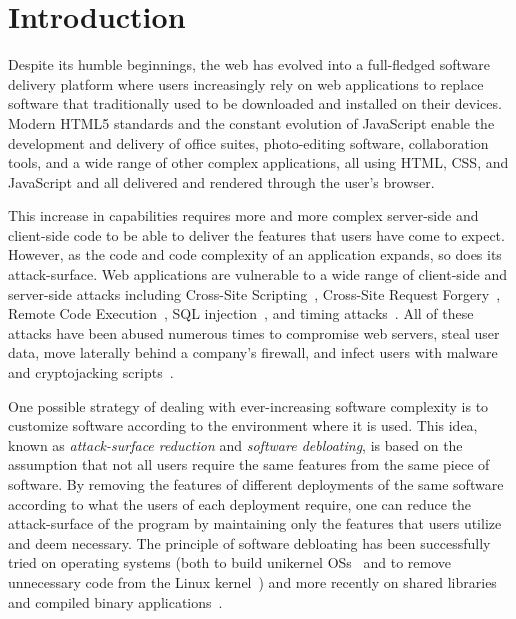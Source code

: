 \section{Introduction}


Despite its humble beginnings, the web has evolved into a full-fledged
software delivery platform where users increasingly rely on web applications
to replace software that traditionally used to be downloaded and installed on
their devices. Modern HTML5 standards and the constant evolution of JavaScript
enable the development and delivery of office suites, photo-editing software,
collaboration tools, and a wide range of other complex applications, all
using HTML, CSS, and JavaScript and all delivered and rendered through the
user's browser.


This increase in capabilities requires more and more complex server-side
and client-side code to be able to deliver the features that users have
come to expect. However, as the code and code complexity of an application
expands, so does its attack-surface. Web applications are vulnerable to
a wide range of client-side and server-side attacks including Cross-Site
Scripting~\cite{xss,kirda2006noxes,vogt2007cross}, Cross-Site
Request Forgery~\cite{csrf,jovanovic2006preventing,barth2008csrf},
Remote Code Execution~\cite{rce}, SQL
injection~\cite{sqlInjection,halfond2006classification}, and timing
attacks~\cite{brumley2003timing,vangoethem2015timing}. All of these
attacks have
been abused numerous times to compromise web servers, steal user data,
move laterally behind a company's firewall, and infect users with malware
and cryptojacking scripts~\cite{minesweeper-ccs2018, wang2018seismic,
cryptojacking-ccs2018}.

One possible strategy of dealing with ever-increasing software complexity is to
customize software according to the environment where it is used. This idea,
known as \textit{attack-surface reduction} and \textit{software debloating},
is based on the assumption that not all users require the same features from
the same piece of software. By removing the features of different deployments
of the same software according to what the users of each deployment require,
one can reduce the attack-surface of the program by maintaining only the
features that users utilize and deem necessary. The principle of software
debloating has been successfully tried on operating systems (both to build
unikernel OSs~\cite{madhavapeddy2013unikernels} and to remove
unnecessary code from the Linux kernel~\cite{kurmus2013attack,
Kurmus:2011:ASR:1972551.1972557}) and more recently on shared
libraries~\cite{mishra2018shredder,quach2018debloating} and compiled binary
applications~\cite{heo2018effective}.

